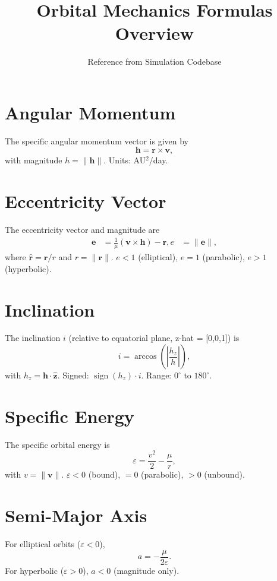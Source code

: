 \documentclass{article}
\title{Orbital Mechanics Formulas Overview}
\author{Reference from Simulation Codebase}
\date{}
\begin{document}
\maketitle

\section{Angular Momentum}
The specific angular momentum vector is given by
\begin{equation}
\mathbf{h} = \mathbf{r} \times \mathbf{v},
\end{equation}
with magnitude $h = \|\mathbf{h}\|$. Units: AU$^2$/day.

\section{Eccentricity Vector}
The eccentricity vector and magnitude are
\begin{align}
\mathbf{e} &= \frac{1}{\mu} (\mathbf{v} \times \mathbf{h}) - \hat{\mathbf{r}}, e &= \|\mathbf{e}\|,
\end{align}
where $\hat{\mathbf{r}} = \mathbf{r} / r$ and $r = \|\mathbf{r}\|$. $e < 1$ (elliptical), $e = 1$ (parabolic), $e > 1$ (hyperbolic).

\section{Inclination}
The inclination $i$ (relative to equatorial plane, z-hat = [0,0,1]) is
\begin{equation}
i = \arccos \left( \left| \frac{h_z}{h} \right| \right),
\end{equation}
with $h_z = \mathbf{h} \cdot \hat{\mathbf{z}}$. Signed: $\operatorname{sign}(h_z) \cdot i$. Range: $0^\circ$ to $180^\circ$.

\section{Specific Energy}
The specific orbital energy is
\begin{equation}
\varepsilon = \frac{v^2}{2} - \frac{\mu}{r},
\end{equation}
with $v = \|\mathbf{v}\|$. $\varepsilon < 0$ (bound), $=0$ (parabolic), $>0$ (unbound).

\section{Semi-Major Axis}
For elliptical orbits ($\varepsilon < 0$),
\begin{equation}
a = -\frac{\mu}{2 \varepsilon}.
\end{equation}
For hyperbolic ($\varepsilon > 0$), $a < 0$ (magnitude only).
\end{document}
